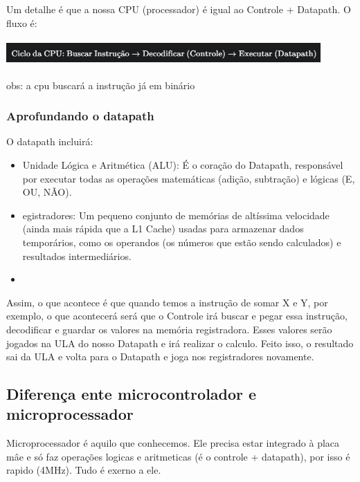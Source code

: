 \documentclass[12pt,a4paper]{report}
\begin{document}
	Um detalhe é que a nossa CPU (processador) é igual ao Controle + Datapath. O fluxo é:
	
	\begin{center}
		
		\includegraphics[width=12cm,height=1cm,keepaspectratio=false]{imagens-teoria/cpu.png}
		
	\end{center}
	
	obs: a cpu buscará a instrução já em binário
	
	\subsubsection{Aprofundando o datapath}
	O datapath incluirá:
	
	\begin{itemize}
		\item Unidade Lógica e Aritmética (ALU): É o coração do Datapath, responsável por executar todas as operações matemáticas (adição, subtração) e lógicas (E, OU, NÃO).
		\item egistradores: Um pequeno conjunto de memórias de altíssima velocidade (ainda mais rápida que a L1 Cache) usadas para armazenar dados temporários, como os operandos (os números que estão sendo calculados) e resultados intermediários.
		\item 
		
	\end{itemize}
	
	Assim, o que acontece é que quando temos a instrução de somar X e Y, por exemplo, o que acontecerá será que o Controle irá buscar e pegar essa instrução, decodificar e guardar os valores na memória registradora. Esses valores serão jogados na ULA do nosso Datapath e irá realizar o calculo. Feito isso, o resultado sai da ULA e volta para o Datapath e joga nos registradores novamente.
	
	\subsection{Diferença ente microcontrolador e microprocessador}
	
	Microprocessador é aquilo que conhecemos. Ele precisa estar integrado à placa mâe e só faz operações logicas e aritmeticas (é o controle + datapath), por isso é rapido (4MHz). Tudo é exerno a ele.
	
\end{document}
